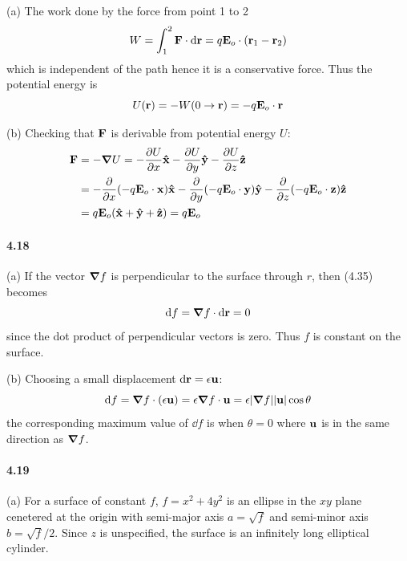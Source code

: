 \documentclass[../problems.tex]{subfiles}
\begin{document}
(a) The work done by the force from point 1 to 2
\begin{align*}
    W = \int_1^2 \vb{F} \cdot \dd{\vb{r}} = q \vb{E}_o \cdot (\vb{r}_1 - \vb{r}_2)
\end{align*}
which is independent of the path hence it is a conservative force. Thus the potential energy is
\begin{equation*}
    U(\vb{r}) = - W(0 \to \vb{r}) = - q \vb{E}_o \cdot \vb{r}
\end{equation*}

(b) Checking that $\vb{F}$ is derivable from potential energy $U$:
\begin{align*}
    \vb{F} &= - \grad{U} = - \pdv{U}{x} \vu{x} - \pdv{U}{y} \vu{y} - \pdv{U}{z} \vu{z} \\
    &= - \pdv{x}(-q \vb{E}_o \cdot \vb{x}) \vu{x} - \pdv{y}(-q \vb{E}_o \cdot \vb{y}) \vu{y} 
    - \pdv{z}(-q \vb{E}_o \cdot \vb{z}) \vu{z} \\
    &= q \vb{E}_o (\vu{x} + \vu{y} + \vu{z}) = q \vb{E}_o
\end{align*}

\paragraph{4.18}
(a) If the vector $\grad{f}$ is perpendicular to the surface through $r$, then (4.35) becomes
\begin{equation}
    \dd{f} = \grad{f} \cdot \dd{\vb{r}} = 0
\end{equation}
since the dot product of perpendicular vectors is zero. Thus $f$ is constant on the surface.

(b) Choosing a small displacement $\dd{\vb{r}} = \epsilon \vb{u}$:
\begin{equation}
    \dd{f} = \grad{f} \cdot (\epsilon \vb{u}) = \epsilon \grad{f} \cdot \vb{u} 
        = \epsilon \abs{\grad{f}} \abs{\vb{u}} \cos \theta
\end{equation}
the corresponding maximum value of $\dd{f}$ is when $\theta = 0$ where $\vb{u}$ is in the same
direction as $\grad{f}$.

\paragraph{4.19}
(a) For a surface of constant $f$, $f = x^2 + 4y^2$ is an ellipse in the $xy$ plane cenetered at the
origin with semi-major axis $a = \sqrt{f}$ and semi-minor axis $b = \sqrt{f} / 2$. Since $z$ is
unspecified, the surface is an infinitely long elliptical cylinder.
\end{document}
